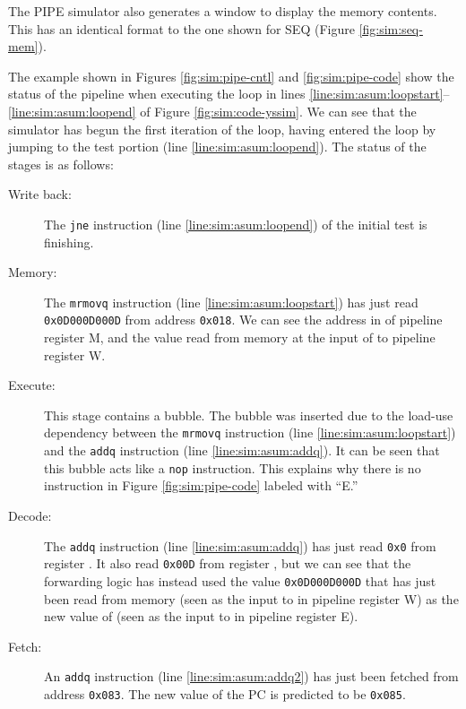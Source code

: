 \documentclass[11pt]{article}
\begin{document}
The PIPE simulator also generates a window to display the memory
contents.  This has an identical format to the one shown for SEQ
(Figure \ref{fig:sim:seq-mem}).

The example shown in Figures \ref{fig:sim:pipe-cntl} and
\ref{fig:sim:pipe-code} show the status of the pipeline when executing
the loop in lines \ref{line:sim:asum:loopstart}--\ref{line:sim:asum:loopend} of Figure \ref{fig:sim:code-yssim}.  We can see
that the simulator has begun the first iteration of the loop, having entered the
loop by jumping to the test portion (line \ref{line:sim:asum:loopend}).
The status of the stages is as follows:
\begin{description}
\item[Write back:] The \texttt{jne} instruction (line \ref{line:sim:asum:loopend}) of the initial test is finishing.

\item[Memory:] The \texttt{mrmovq} instruction (line \ref{line:sim:asum:loopstart}) has just read
\texttt{0x0D000D000D} from address \texttt{0x018}.  We can see the address in
 of pipeline register M, and the value read from
memory at the input of  to pipeline register W\@.

\item[Execute:] This stage contains a bubble.  The bubble was inserted
due to the load-use dependency between the \texttt{mrmovq} instruction
(line \ref{line:sim:asum:loopstart}) and the \texttt{addq} instruction (line \ref{line:sim:asum:addq}).  It can be seen
that this bubble acts like a \texttt{nop} instruction.  This explains why
there is no instruction in Figure \ref{fig:sim:pipe-code} labeled with ``E.''

\item[Decode:] The \texttt{addq} instruction (line \ref{line:sim:asum:addq}) has just read
\texttt{0x0} from register \raxreg{}.  It also read \texttt{0x00D}
from register \rxreg{}, but we can see that the forwarding logic has
instead used the value \texttt{0x0D000D000D} that has just been read from
memory (seen as the input to  in pipeline register W) as
the new value of  (seen as the input to  in
pipeline register E).

\item[Fetch:] An \texttt{addq} instruction (line \ref{line:sim:asum:addq2}) has just been
fetched from address \texttt{0x083}.  The new value of the PC is
predicted to be \texttt{0x085}.
\end{description}
\end{document}
